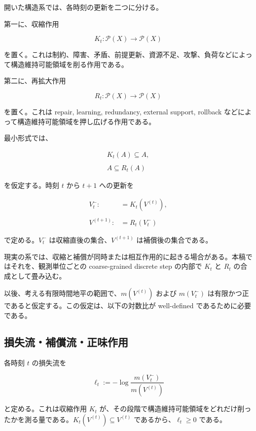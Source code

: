 \documentclass[12pt,a4paper]{article}
\begin{document}
開いた構造系では、各時刻の更新を二つに分ける。

第一に、収縮作用

\[
K_{t} : \mathcal P(X) \to \mathcal P(X)
\]

を置く。これは制約、障害、矛盾、前提更新、資源不足、攻撃、負荷などによって構造維持可能領域を削る作用である。

第二に、再拡大作用

\[
R_{t} : \mathcal P(X) \to \mathcal P(X)
\]

を置く。これは repair, learning, redundancy, external support, rollback などによって構造維持可能領域を押し広げる作用である。

最小形式では、

\[
\begin{aligned}
K_{t}(A) \subseteq A, \\
\qquad \\
A \subseteq R_{t}(A)
\end{aligned}
\]

を仮定する。時刻 \(t\) から \(t+1\) への更新を

\[
\begin{aligned}
V_{t}^- :&= K_{t}(V^{(t)}), \\
\qquad \\
V^{(t+1)} :&= R_{t}(V_{t}^-)
\end{aligned}
\]

で定める。\(V_{t}^-\) は収縮直後の集合、\(V^{(t+1)}\) は補償後の集合である。

現実の系では、収縮と補償が同時または相互作用的に起きる場合がある。本稿ではそれを、観測単位ごとの coarse-grained discrete step の内部で \(K_{t}\) と \(R_{t}\) の合成として畳み込む。

以後、考える有限時間地平の範囲で、\(m(V^{(t)})\) および \(m(V_{t}^-)\) は有限かつ正であると仮定する。この仮定は、以下の対数比が well-defined であるために必要である。

\subsection{損失流・補償流・正味作用}\label{ux640dux5931ux6d41ux88dcux511fux6d41ux6b63ux5473ux4f5cux7528}

各時刻 \(t\) の損失流を

\[
\ell_{t} := -\log \frac{m(V_{t}^-)}{m(V^{(t)})}
\]

と定める。これは収縮作用 \(K_{t}\) が、その段階で構造維持可能領域をどれだけ削ったかを測る量である。\(K_{t}(V^{(t)})\subseteq V^{(t)}\) であるから、\(\ell_{t}\ge 0\) である。
\end{document}
